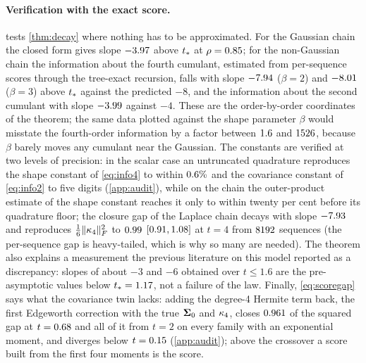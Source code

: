\paragraph{Verification with the exact score.}
 tests \cref{thm:decay} where nothing has to be approximated. For the
Gaussian chain the closed form gives slope $-3.97$ above $t_\ast$ at
$\rho=0.85$; for the non-Gaussian chain the information about the fourth cumulant,
estimated from per-sequence scores through the tree-exact recursion, falls with slope
$-7.94$ ($\beta=2$) and $-8.01$ ($\beta=3$) above $t_\ast$
against the predicted $-8$, and the information about the second cumulant with slope
$-3.99$ against $-4$. These are the order-by-order coordinates of the theorem; the same data
plotted against the shape parameter $\beta$ would misstate the fourth-order information by a factor between
$1.6$ and $1526$, because $\beta$ barely moves any cumulant near the Gaussian. The constants are verified at two levels of precision:
in the scalar case an untruncated quadrature reproduces the shape constant of
\cref{eq:info4} to within $0.6\%$ and the covariance constant of
\cref{eq:info2} to five digits (\cref{app:audit}), while on the chain the outer-product
estimate of the shape constant reaches it only to within twenty per cent before its
quadrature floor; the closure gap of the Laplace chain decays with slope
$-7.93$ and reproduces $\tfrac16\lVert \kappa_4 \rVert_{F}^2$ to
$0.99$
$[0.91,1.08]$ at $t=4$ from
$8192$ sequences (the per-sequence gap is heavy-tailed, which is why so many
are needed). The theorem also explains a measurement the previous literature on this
model reported as a discrepancy: slopes of about $-3$ and $-6$ obtained over $t\le1.6$
are the pre-asymptotic values below $t_\ast=1.17$, not a failure of the
law. Finally, \cref{eq:scoregap} says what the covariance twin lacks: adding the degree-4
Hermite term back, the first Edgeworth correction with the true $\mathbf{\Sigma}_0$ and $\kappa_4$,
closes $0.961$ of the squared gap at
$t=0.68$ and all of it from $t=2$ on every family with an
exponential moment, and diverges below $t=0.15$
(\cref{app:audit}); above the crossover a score built from the first four moments is the
score.

